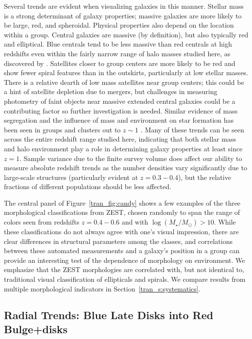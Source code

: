 Several trends are evident when visualizing galaxies in this
manner. Stellar mass is a strong determinant of galaxy properties;
massive galaxies are more likely to be large, red, and
spheroidal. Physical properties also depend on the location within a
group. Central galaxies are massive (by definition), but also
typically red and elliptical. Blue centrals tend to be less massive
than red centrals at high redshifts even within the fairly narrow
range of halo masses studied here, as discovered by
\citet{Tinker2012}. Satellites closer to group centers are more likely
to be red and show fewer spiral features than in the outskirts,
particularly at low stellar masses. There is a relative dearth of low
mass satellites near group centers; this could be a hint of satellite
depletion due to mergers, but challenges in measuring photometry of
faint objects near massive extended central galaxies could be a
contributing factor so further investigation is needed. Similar
evidence of mass segregation and the influence of mass and environment
on star formation has been seen in groups and clusters out to $z\sim
1$ \citep{Muzzin2012, Presotto2012}. Many of these trends can be seen
across the entire redshift range studied here, indicating that both
stellar mass and halo environment play a role in determining galaxy
properties at least since $z=1$. Sample variance due to the finite
survey volume does affect our ability to measure absolute redshift
trends as the number densities vary significantly due to large-scale
structures (particularly evident at $z=0.3-0.4$), but the relative
fractions of different populations should be less affected.

The central panel of Figure~\ref{tran_fig:candy} shows a few examples of
the three morphological classifications from ZEST, chosen randomly to
span the range of colors seen from redshifts $z=0.4-0.6$ and with
$\log(M_{\star}/M_{\odot})>10$. While these classifications do not
always agree with one's visual impression, there are clear differences
in structural parameters among the classes, and correlations between these automated
measurements and a galaxy's position in a group can provide an
interesting test of the dependence of morphology on environment. We
emphasize that the ZEST morphologies are correlated with, but not
identical to, traditional visual classification of ellipticals and
spirals. We compare results from multiple morphological indicators in
Section~\ref{tran_s:systematics}.

\subsection{Radial Trends: Blue Late Disks into Red Bulge+disks}
\label{tran_s:rtrends}

